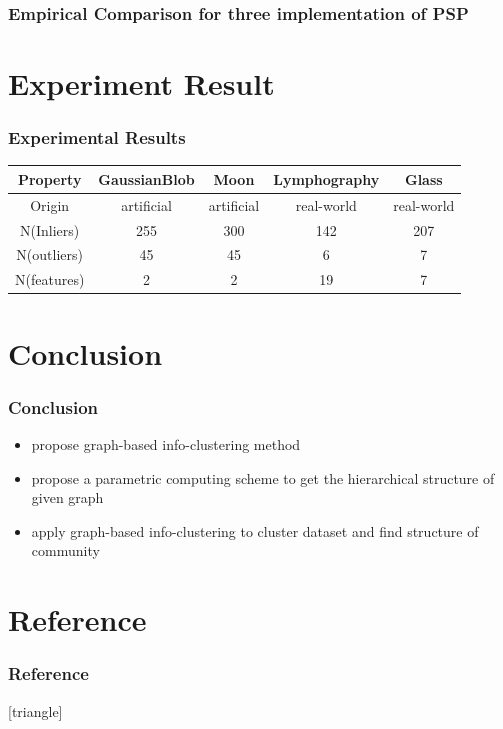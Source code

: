 \documentclass[notheorems]{beamer}
\begin{document}
\begin{frame}
	\frametitle{Empirical Comparison for three implementation of PSP}
\end{frame}
\section{Experiment Result}
\begin{frame}
	\frametitle{Experimental Results}
\begin{table}
\centering
{\scriptsize
\begin{tabular}{ccccc}
\hline
       Property        &  GaussianBlob   &      Moon       &  Lymphography  &     Glass     \\
\hline
   Origin    & artificial & artificial & real-world & real-world \\
   N(Inliers) & 255  & 300 & 142  & 207 \\
   N(outliers)   & 45 &  45  & 6 & 7 \\
   N(features)   & 2 &  2  & 19 & 7  \\
\hline
\end{tabular}

}
\end{table}

\end{frame}	
\section{Conclusion}
\begin{frame}
\frametitle{Conclusion}
\begin{itemize}
\item propose graph-based info-clustering method
\item propose a parametric computing scheme to get the hierarchical structure of given graph 
\item apply graph-based info-clustering to cluster dataset and find structure of community
\end{itemize}
\end{frame}
\section*{Reference}
\begin{frame}
\frametitle{Reference}
[triangle]

{\scriptsize

}
\end{frame}
\end{document}
